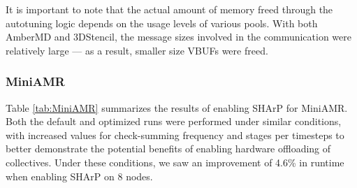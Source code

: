 It is important to note that the actual amount of memory freed through the autotuning logic depends on the usage levels of various pools. With both AmberMD and 3DStencil, the message sizes involved in the communication were relatively large --- as a result, smaller size VBUFs were freed.

\begin{table}[!htbp]
  \centering
  \small
  \captionsetup{justification=centering}
  \caption{3DStencil: Impact of Eager threshold and autotuning on execution time and memory usage}
  \label{tab:3DStencil}
\end{table}
\subsubsection{MiniAMR}
Table \ref{tab:MiniAMR} summarizes the results of enabling SHArP for MiniAMR. Both the default and optimized runs were performed under similar conditions, with increased values for check-summing frequency and stages per timesteps to better demonstrate the potential benefits of enabling hardware offloading of collectives. Under these conditions, we saw an improvement of 4.6\% in runtime when enabling SHArP on 8 nodes. 

